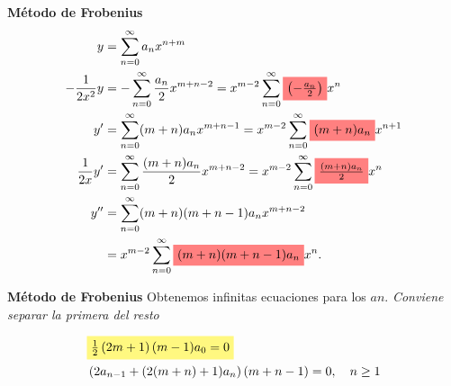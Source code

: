 \begin{frame}[fragile]{\textbf{Método de Frobenius}}
\vspace{-.5cm}
{\small
\[
    \begin{split}
    y&=\sum_{n=0}^{\infty}a_{n}x^{n+m}\\
    -\frac{1}{2x^2}y&=-\sum_{n=0}^{\infty}\frac{a_n}{2}x^{m+n-2}=x^{m-2}\sum_{n=0}^{\infty}
         \tikz[baseline]{
                     \node[fill=red!50,anchor=base] (n1)
                      {\textcolor{black}{$\left(-\frac{a_n}{2}\right)$}}}
     x^{n}\\
      y'&=\sum_{n=0}^{\infty}(m+n)a_{n}x^{m+n-1}=x^{m-2}\sum_{n=0}^{\infty}
               \tikz[baseline]{
                     \node[fill=red!50,anchor=base] (n2)
                      {\textcolor{black}{$(m+n)a_{n}$}}}
      x^{n+1}\\
      \frac{1}{2x}y'&=\sum_{n=0}^{\infty}\frac{(m+n)a_{n}}{2}x^{m+n-2}=x^{m-2}\sum_{n=0}^{\infty}
     \tikz[baseline]{
                 \node[fill=red!50,anchor=base] (n3)
               {\textcolor{black}{$\frac{(m+n)a_{n}}{2}$}}}
      x^{n}\\
      y''&=\sum_{n=0}^{\infty}(m+n)(m+n-1)a_{n}x^{m+n-2}\\
&= x^{m-2}\sum_{n=0}^{\infty}
     \tikz[baseline]{
                 \node[fill=red!50,anchor=base] (n4)
               {\textcolor{black}{$(m+n)(m+n-1)a_{n}$}}}
x^{n}.
    \end{split}
\]
}





\end{frame}








\begin{frame}[fragile]{\textbf{Método de Frobenius}}
Obtenemos infinitas ecuaciones para los $an$. \emph{Conviene separar la primera del resto}

\begin{equation}\label{eq:ecua_ejem_frob}
    \begin{split}
         &\tikz[baseline]{
                 \node[fill=yellow!50,anchor=base] (n1)
               {\textcolor{black}{$\frac12\left(2m+1\right)(m-1) a_0=0$}}}
      \\
     &\left(   2a_{n-1}+ (2(m+n)+1)a_{n}  \right)(m+n-1) =0,\quad n\geq 1\\
    \end{split}
\end{equation}

  



\end{frame}




